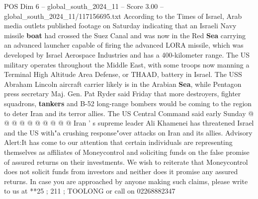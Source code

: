 \begin{textsample}{POS Dim 6 – global\_south\_2024\_11 – Score 3.00 – global\_south\_2024\_11/117156695.txt}
According to the Times of Israel, Arab media outlets published footage on Saturday indicating that an Israeli Navy missile \textbf{boat} had crossed the Suez Canal and was now in the Red \textbf{Sea} carrying an advanced launcher capable of firing the advanced LORA missile, which was developed by Israel Aerospace Industries and has a 400-kilometer range.
The US military operates throughout the Middle East, with some troops now manning a Terminal High Altitude Area Defense, or THAAD, battery in Israel.
The USS Abraham Lincoln aircraft carrier likely is in the Arabian \textbf{Sea}, while Pentagon press secretary Maj.
Gen.
Pat Ryder said Friday that more destroyers, fighter squadrons, \textbf{tankers} and B-52 long-range bombers would be coming to the region to deter Iran and its terror allies.
The US Central Command said early Sunday @ @ @ @ @ @ @ @ @ @ Iran ' s supreme leader Ali Khamenei has threatened Israel and the US with"a crushing response"over attacks on Iran and its allies.
Advisory Alert:It has come to our attention that certain individuals are representing themselves as affiliates of Moneycontrol and soliciting funds on the false promise of assured returns on their investments.
We wish to reiterate that Moneycontrol does not solicit funds from investors and neither does it promise any assured returns.
In case you are approached by anyone making such claims, please write to us at **25 ; 211 ; TOOLONG or call on 02268882347

\end{textsample}
